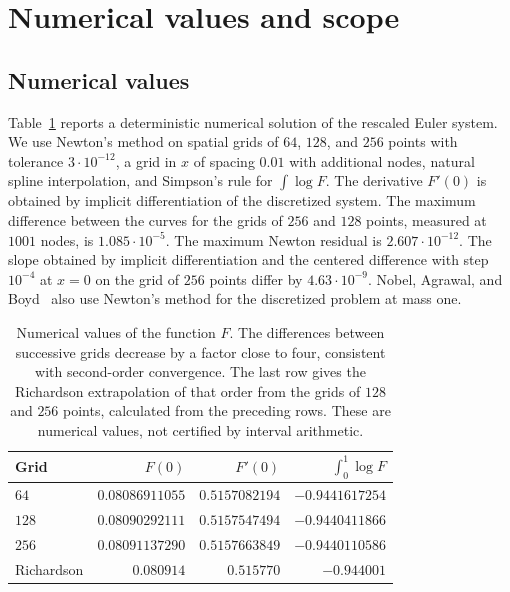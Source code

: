 \section{Numerical values and scope}\label{sec:discusion}

\subsection{Numerical values}

Table~\ref{tab:numerica} reports a deterministic numerical solution of the rescaled Euler system. We use Newton's method on spatial
grids of $64$, $128$, and $256$ points with tolerance $3\cdot10^{-12}$, a grid in $x$ of spacing $0.01$ with additional nodes, natural
spline interpolation, and Simpson's rule for $\int\log F$. The derivative $F'(0)$ is obtained by implicit differentiation of the
discretized system. The maximum difference between the curves for the grids of $256$ and $128$ points, measured at $1001$ nodes, is
$1.085\cdot10^{-5}$. The maximum Newton residual is $2.607\cdot10^{-12}$. The slope obtained by implicit differentiation and the
centered difference with step $10^{-4}$ at $x=0$ on the grid of $256$ points differ by $4.63\cdot10^{-9}$. Nobel, Agrawal, and
Boyd~\cite{NAB} also use Newton's method for the discretized problem at mass one.

\begin{table}[ht] \centering \begin{tabular}{lrrr}
\toprule
Grid & $F(0)$ & $F'(0)$ & $\int_0^1\log F$\\
\midrule
$64$ & $0.08086911055$ & $0.5157082194$ & $-0.9441617254$\\
$128$ & $0.08090292111$ & $0.5157547494$ & $-0.9440411866$\\
$256$ & $0.08091137290$ & $0.5157663849$ & $-0.9440110586$\\
\midrule
Richardson & $0.080914$ & $0.515770$ & $-0.944001$\\
\bottomrule
\end{tabular} \caption{Numerical values of the function $F$. The differences between successive grids decrease by a factor close to
four, consistent with second-order convergence. The last row gives the Richardson extrapolation of that order from the grids of $128$
and $256$ points, calculated from the preceding rows. These are numerical values, not certified by interval arithmetic.} \label{tab:numerica}
\end{table}

